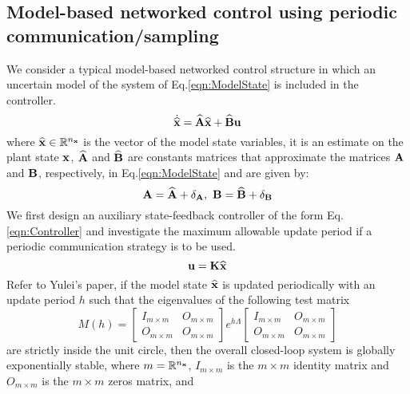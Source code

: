 \documentclass[letterpaper, 10 pt, conference]{ieeeconf}\IEEEoverridecommandlockouts%
\begin{document}

\subsection{Model-based networked control using periodic communication/sampling}\label{sec:PeriodicCommu}
We consider a typical model-based networked control structure in which an uncertain model of the system of Eq.\ref{eqn:ModelState} is included in the controller.
\begin{equation}\label{eqn:ModelState}
  \dot{\widehat{\mathbf{x}}} = \widehat{\mathbf{A}}\widehat{\mathbf{x}} + \widehat{\mathbf{B}}\mathbf{u}
\end{equation}
where $\widehat{\mathbf{x}}\in\mathbb{R}^{n_{\mathbf{x}}}$ is the vector of the model state variables, it is an estimate on the plant state $\mathbf{x}$, $\widehat{\mathbf{A}}$ and $\widehat{\mathbf{B}}$ are constants matrices that approximate the matrices $\mathbf{A}$ and $\mathbf{B}$, respectively, in Eq.\ref{eqn:ModelState} and are given by:
\begin{equation}\label{eqn:ModelUncertainty}
  \mathbf{A} = \widehat{\mathbf{A}} + \delta_{\mathbf{A}},\ \mathbf{B} = \widehat{\mathbf{B}} + \delta_{\mathbf{B}}
\end{equation}
 We first design an auxiliary state-feedback controller of the form Eq.\ref{eqn:Controller} and investigate the maximum allowable update period if a periodic communication strategy is to be used.
\begin{equation}\label{eqn:Controller}
  \mathbf{u} = \mathbf{K}\widehat{\mathbf{x}}
\end{equation}
Refer to Yulei's paper, if the model state $\widehat{\mathbf{x}}$ is updated periodically with an update period $h$ such that the eigenvalues of the following test matrix
\begin{equation}\label{eqn:StabilityCondition}
  M(h) = \left[\begin{array}{cc}
          I_{m\times m} & O_{m\times m}\\
          O_{m\times m} & O_{m\times m}
        \end{array}\right]e^{h\Lambda}\left[\begin{array}{cc}
          I_{m\times m} & O_{m\times m}\\
          O_{m\times m} & O_{m\times m}
        \end{array}\right]
\end{equation}
are strictly inside the unit circle, then the overall closed-loop system is globally exponentially stable, where $m = \mathbb{R}^{n_{\mathbf{x}}}$, $I_{m\times m}$ is the $m\times m$ identity matrix and $O_{m\times m}$ is the $m\times m$ zeros matrix, and
\end{document}
